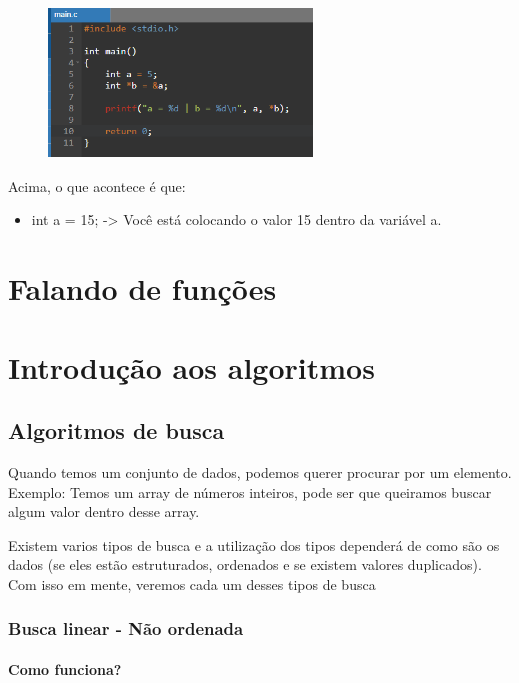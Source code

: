 \documentclass{report}
\begin{document}
	\begin{figure}[ht]
		\centering
		\includegraphics[width=7cm,height=4cm,keepaspectratio=false]{imagens/ponteiro.png}
		
	\end{figure}
	
	Acima, o que acontece é que:
	
	\begin{itemize}
		\item int a = 15; -> Você está colocando o valor 15 dentro da variável a.
	\end{itemize}
	
	\chapter{Falando de funções}
	
	\chapter{Introdução aos algoritmos}
	\section{Algoritmos de busca}
	Quando temos um conjunto de dados, podemos querer procurar por um elemento. Exemplo: Temos um array de números inteiros, pode ser que queiramos buscar algum valor dentro desse array.
	
	Existem varios tipos de busca e a utilização dos tipos dependerá de como são os dados (se eles estão estruturados, ordenados e se existem valores duplicados). Com isso em mente, veremos cada um desses tipos de busca
	\subsection{Busca linear - Não ordenada}
	
	\subsubsection{Como funciona?}
	
\end{document}
